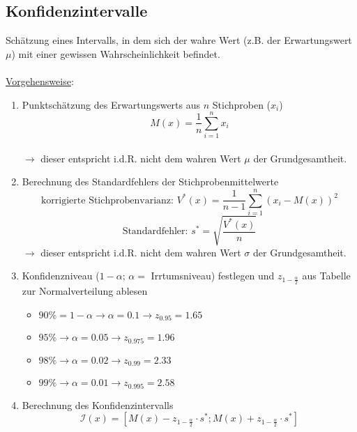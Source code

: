 \subsection{Konfidenzintervalle}

Schätzung eines Intervalls, in dem sich der wahre Wert (z.B. der Erwartungswert~\(\mu\)) mit einer gewissen Wahrscheinlichkeit befindet.
\\\\
\underline{Vorgehensweise}:
\begin{enumerate}
    \item Punktschätzung des Erwartungswerts aus \(n\) Stichproben (\(x_i\))
            \[M(x)=\frac{1}{n}\sum_{i=1}^{n}x_i\]\\
            \(\rightarrow\) dieser entspricht i.d.R. nicht dem wahren Wert \(\mu\) der Grundgesamtheit.
    \item Berechnung des Standardfehlers der Stichprobenmittelwerte
            \[\text{korrigierte Stichprobenvarianz: }V^*(x)=\frac{1}{n-1}\sum_{i=1}^{n}(x_i-M(x))^2\]
            \[\text{Standardfehler: }s^*=\sqrt{\frac{V^*(x)}{n}}\]
            \(\rightarrow\) dieser entspricht i.d.R. nicht dem wahren Wert \(\sigma\) der Grundgesamtheit.
    \item Konfidenzniveau (\(1-\alpha\); \(\alpha=\) Irrtumsniveau) festlegen und \(z_{1-\frac{\alpha}{2}}\) aus Tabelle zur Normalverteilung ablesen
        \begin{itemize}
            \item \(90\% = 1-\alpha \rightarrow \alpha=0.1\rightarrow z_{0.95}=1.65\)
            \item \(95\% \rightarrow \alpha=0.05\rightarrow z_{0.975}=1.96\)
            \item \(98\% \rightarrow \alpha=0.02\rightarrow z_{0.99}=2.33\)
            \item \(99\% \rightarrow \alpha=0.01\rightarrow z_{0.995}=2.58\)
        \end{itemize}
    \item Berechnung des Konfidenzintervalls
    \begin{equation*}
        \mathcal{I}(x) = \left[M(x) - z_{1-\frac{\alpha}{2}} \cdot s^*; M(x) + z_{1-\frac{\alpha}{2}} \cdot s^*\right]
    \end{equation*}
\end{enumerate}
